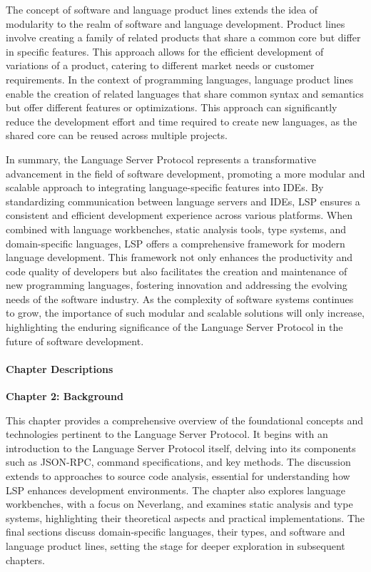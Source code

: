 The concept of software and language product lines extends the idea of modularity to the realm of software and language development. Product lines involve creating a family of related products that share a common core but differ in specific features. This approach allows for the efficient development of variations of a product, catering to different market needs or customer requirements. In the context of programming languages, language product lines enable the creation of related languages that share common syntax and semantics but offer different features or optimizations. This approach can significantly reduce the development effort and time required to create new languages, as the shared core can be reused across multiple projects.

In summary, the Language Server Protocol represents a transformative advancement in the field of software development, promoting a more modular and scalable approach to integrating language-specific features into IDEs. By standardizing communication between language servers and IDEs, LSP ensures a consistent and efficient development experience across various platforms. When combined with language workbenches, static analysis tools, type systems, and domain-specific languages, LSP offers a comprehensive framework for modern language development. This framework not only enhances the productivity and code quality of developers but also facilitates the creation and maintenance of new programming languages, fostering innovation and addressing the evolving needs of the software industry. As the complexity of software systems continues to grow, the importance of such modular and scalable solutions will only increase, highlighting the enduring significance of the Language Server Protocol in the future of software development.

\paragraph{Chapter Descriptions}

\textbf{Chapter 2: Background}

This chapter provides a comprehensive overview of the foundational concepts and technologies pertinent to the Language Server Protocol. It begins with an introduction to the Language Server Protocol itself, delving into its components such as JSON-RPC, command specifications, and key methods. The discussion extends to approaches to source code analysis, essential for understanding how LSP enhances development environments. The chapter also explores language workbenches, with a focus on Neverlang, and examines static analysis and type systems, highlighting their theoretical aspects and practical implementations. The final sections discuss domain-specific languages, their types, and software and language product lines, setting the stage for deeper exploration in subsequent chapters.

